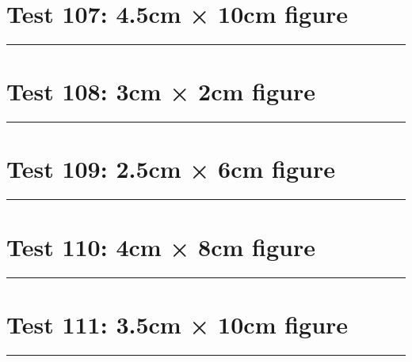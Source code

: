\documentclass[a4paper,11pt]{article}
\begin{document}
\section*{Test 107: 4.5cm × 10cm figure}
\begin{swarmwrap}%
  \begin{minipage}[t]{4cm}
    \centering
    \rule{\linewidth}{10cm}
  \end{minipage}%
\end{swarmwrap}%
\swarmwrapnext
\lipsum[139]
\lipsum[140]
\lipsum[141]
\lipsum[142]
\lipsum[143]
\lipsum[144]
\section*{Test 108: 3cm × 2cm figure}
\begin{swarmwrap}%
  \begin{minipage}[t]{3cm}
    \centering
    \rule{\linewidth}{2cm}
  \end{minipage}%
\end{swarmwrap}%
\swarmwrapnext
\lipsum[68]
\lipsum[69]
\lipsum[70]
\section*{Test 109: 2.5cm × 6cm figure}
\begin{swarmwrap}%
  \begin{minipage}[t]{2cm}
    \centering
    \rule{\linewidth}{6cm}
  \end{minipage}%
\end{swarmwrap}%
\swarmwrapnext
\lipsum[29]
\lipsum[30]
\lipsum[31]
\section*{Test 110: 4cm × 8cm figure}
\begin{swarmwrap}%
  \begin{minipage}[t]{4cm}
    \centering
    \rule{\linewidth}{8cm}
  \end{minipage}%
\end{swarmwrap}%
\swarmwrapnext
\lipsum[82]
\lipsum[83]
\lipsum[84]
\lipsum[85]
\lipsum[86]
\section*{Test 111: 3.5cm × 10cm figure}
\begin{swarmwrap}%
  \begin{minipage}[t]{3cm}
    \centering
    \rule{\linewidth}{10cm}
  \end{minipage}%
\end{swarmwrap}%
\swarmwrapnext
\lipsum[100]
\lipsum[101]
\lipsum[102]
\end{document}
